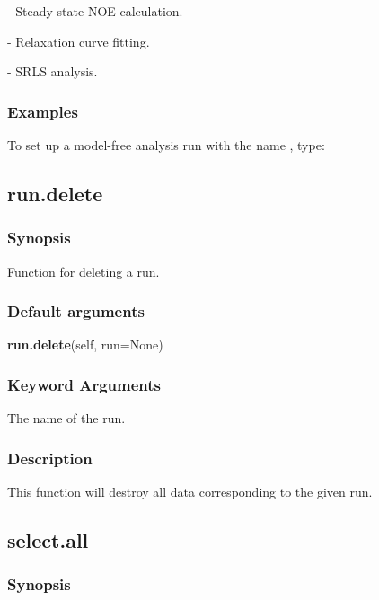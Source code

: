 - Steady state NOE calculation.
    
 - Relaxation curve fitting.
    
 - SRLS analysis.


\subsubsection{Examples}

To set up a model-free analysis run with the name 
, type:




\newpage

\subsection{run.delete}


\subsubsection{Synopsis}

Function for deleting a run.

\subsubsection{Default arguments}

\textsf{\textbf{run.delete}(self, run=None)}


\subsubsection{Keyword Arguments}

  The name of the run.

\subsubsection{Description}

This function will destroy all data corresponding to the given run.


\newpage

\subsection{select.all}


\subsubsection{Synopsis}


